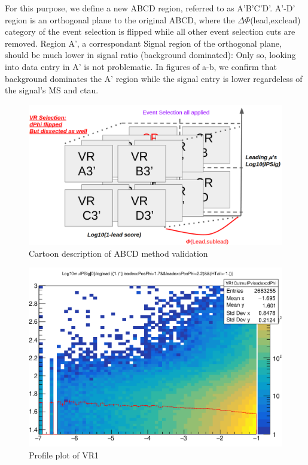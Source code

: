 For this purpose, we define a new ABCD region, referred to as A'B'C'D'.
A'-D' region is an orthogonal plane to the original ABCD, where the $\Delta\Phi$(lead,exclead) category of the event selection is flipped while all other event selection cuts are removed.
Region A', a correspondant Signal region of the orthogonal plane, should be much lower in signal ratio (background dominated): Only so, looking into data entry in A' is not problematic. 
In figures of a-b, we confirm that background dominates the A' region while the signal entry is lower regardeless of the signal's MS and ctau.

\begin{figure}[h!]
  \caption{Cartoon description of ABCD method validation}
  \label{fig:valcar}
  \centering
  \includegraphics[width=0.85\linewidth]{figs/Valcart.png}

\end{figure}


\begin{figure}[h!]
  \caption{Profile plot of VR1}
  \label{fig:valcar2}
  \centering
  \includegraphics[width=0.65\linewidth]{figs/VR1.png}

\end{figure}

